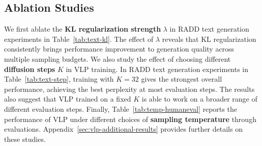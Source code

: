 \subsection{Ablation Studies}

We first ablate the \textbf{KL regularization strength} $\lambda$ in RADD text generation experiments in Table~\ref{tab:text-kl}. The effect of $\lambda$ reveals that KL regularization consistently brings performance improvement to generation quality across multiple sampling budgets. We also study the effect of choosing different \textbf{diffusion steps} $K$ in VLP training. In RADD text generation experiments in Table~\ref{tab:text-step}, training with $K=32$ gives the strongest overall performance, achieving the best perplexity at most evaluation steps. The results also suggest that VLP trained on a fixed $K$ is able to work on a broader range of different evaluation steps. Finally, Table~\ref{tab:temp-humaneval} reports the performance of VLP under different choices of \textbf{sampling temperature} through evaluations. Appendix~\ref{sec:vlp-additional-results} provides further details on these studies. 
